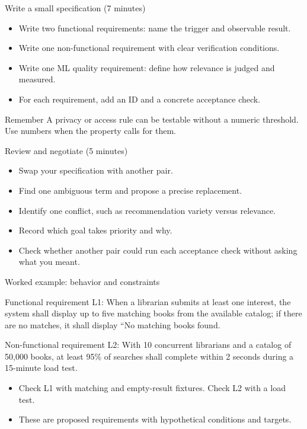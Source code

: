 \begin{frame}{Write a small specification (7 minutes)}
\begin{itemize}
\item Write two functional requirements: name the trigger and observable result.
\item Write one non-functional requirement with clear verification conditions.
\item Write one ML quality requirement: define how relevance is judged and measured.
\item For each requirement, add an ID and a concrete acceptance check.
\end{itemize}\begin{block}{Remember}
A privacy or access rule can be testable without a numeric threshold. Use numbers when the property calls for them.
\end{block}
\coursefooter
\end{frame}

\begin{frame}{Review and negotiate (5 minutes)}
\begin{itemize}
\item Swap your specification with another pair.
\item Find one ambiguous term and propose a precise replacement.
\item Identify one conflict, such as recommendation variety versus relevance.
\item Record which goal takes priority and why.
\item Check whether another pair could run each acceptance check without asking what you meant.
\end{itemize}
\coursefooter
\end{frame}

\begin{frame}{Worked example: behavior and constraints}
\begin{block}{Functional requirement}
L1: When a librarian submits at least one interest, the system shall display up to five matching books from the available catalog; if there are no matches, it shall display ``No matching books found.
\end{block}
\begin{block}{Non-functional requirement}
L2: With 10 concurrent librarians and a catalog of 50,000 books, at least 95\% of searches shall complete within 2 seconds during a 15-minute load test.
\end{block}
\begin{itemize}
\item Check L1 with matching and empty-result fixtures. Check L2 with a load test.
\item These are proposed requirements with hypothetical conditions and targets.
\end{itemize}
\coursefooter
\end{frame}

